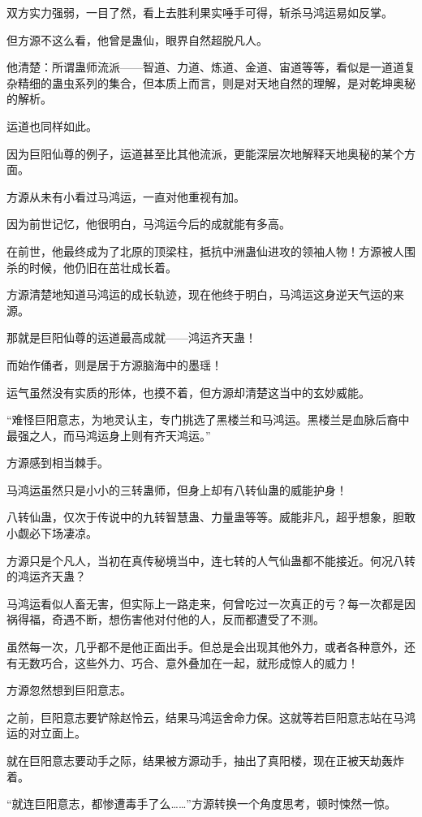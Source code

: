 \begin{this_body}
双方实力强弱，一目了然，看上去胜利果实唾手可得，斩杀马鸿运易如反掌。

但方源不这么看，他曾是蛊仙，眼界自然超脱凡人。

他清楚：所谓蛊师流派——智道、力道、炼道、金道、宙道等等，看似是一道道复杂精细的蛊虫系列的集合，但本质上而言，则是对天地自然的理解，是对乾坤奥秘的解析。

运道也同样如此。

因为巨阳仙尊的例子，运道甚至比其他流派，更能深层次地解释天地奥秘的某个方面。

方源从未有小看过马鸿运，一直对他重视有加。

因为前世记忆，他很明白，马鸿运今后的成就能有多高。

在前世，他最终成为了北原的顶梁柱，抵抗中洲蛊仙进攻的领袖人物！方源被人围杀的时候，他仍旧在茁壮成长着。

方源清楚地知道马鸿运的成长轨迹，现在他终于明白，马鸿运这身逆天气运的来源。

那就是巨阳仙尊的运道最高成就——鸿运齐天蛊！

而始作俑者，则是居于方源脑海中的墨瑶！

运气虽然没有实质的形体，也摸不着，但方源却清楚这当中的玄妙威能。

“难怪巨阳意志，为地灵认主，专门挑选了黑楼兰和马鸿运。黑楼兰是血脉后裔中最强之人，而马鸿运身上则有齐天鸿运。”

方源感到相当棘手。

马鸿运虽然只是小小的三转蛊师，但身上却有八转仙蛊的威能护身！

八转仙蛊，仅次于传说中的九转智慧蛊、力量蛊等等。威能非凡，超乎想象，胆敢小觑必下场凄凉。

方源只是个凡人，当初在真传秘境当中，连七转的人气仙蛊都不能接近。何况八转的鸿运齐天蛊？

马鸿运看似人畜无害，但实际上一路走来，何曾吃过一次真正的亏？每一次都是因祸得福，奇遇不断，想伤害他对付他的人，反而都遭受了不测。

虽然每一次，几乎都不是他正面出手。但总是会出现其他外力，或者各种意外，还有无数巧合，这些外力、巧合、意外叠加在一起，就形成惊人的威力！

方源忽然想到巨阳意志。

之前，巨阳意志要铲除赵怜云，结果马鸿运舍命力保。这就等若巨阳意志站在马鸿运的对立面上。

就在巨阳意志要动手之际，结果被方源动手，抽出了真阳楼，现在正被天劫轰炸着。

“就连巨阳意志，都惨遭毒手了么……”方源转换一个角度思考，顿时悚然一惊。


\end{this_body}

